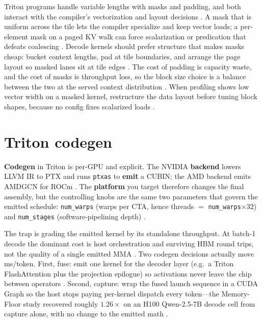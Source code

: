 Triton programs handle variable lengths with masks and padding, and both interact with the compiler's vectorization and layout decisions \citep{tritonlang2024,kwon2023vllm}. A mask that is uniform across the tile lets the compiler specialize and keep vector loads; a per-element mask on a paged KV walk can force scalarization or predication that defeats coalescing \citep{tritonlang2024,memoryfloor2026}. Decode kernels should prefer structure that makes masks cheap: bucket context lengths, pad at tile boundaries, and arrange the page layout so masked lanes sit at tile edges \citep{kwon2023vllm,patel2025llminference}. The cost of padding is capacity waste, and the cost of masks is throughput loss, so the block size choice is a balance between the two at the served context distribution \citep{memoryfloor2026,taxbreak2026}. When profiling shows low vector width on a masked kernel, restructure the data layout before tuning block shapes, because no config fixes scalarized loads \citep{tritonlang2024,memoryfloor2026}.

\section{Triton codegen}
\label{sec:ch17_triton_codegen}

\textbf{Codegen} in Triton is per-GPU and explicit. The NVIDIA \textbf{backend} lowers LLVM IR to PTX and runs \texttt{ptxas} to \textbf{emit} a CUBIN; the AMD backend emits AMDGCN for ROCm \citep{tritonlang2024}. The \textbf{platform} you target therefore changes the final assembly, but the controlling knobs are the same two parameters that govern the emitted schedule: \texttt{num\_warps} (warps per CTA, hence threads $=$ \texttt{num\_warps}$\times 32$) and \texttt{num\_stages} (software-pipelining depth) \citep{tritonlang2024}.

The trap is grading the emitted kernel by its standalone throughput. At batch-1 decode the dominant cost is host orchestration and surviving HBM round trips, not the quality of a single emitted MMA \citep{taxbreak2026,memoryfloor2026}. Two codegen decisions actually move ms/token. First, fuse: emit one kernel for the decoder layer (e.g.\ a Triton FlashAttention plus the projection epilogue) so activations never leave the chip between operators \citep{dao2022flashattention}. Second, capture: wrap the fused launch sequence in a CUDA Graph so the host stops paying per-kernel dispatch every token---the Memory-Floor study recovered roughly $1.26\times$ on an H100 Qwen-2.5-7B decode cell from capture alone, with no change to the emitted math \citep{memoryfloor2026,nvidia2024cudagraphs}.

